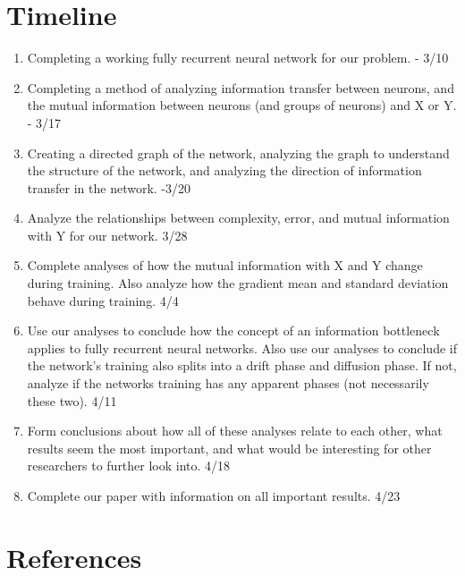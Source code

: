 \section{Timeline}
\begin{enumerate}
	\item Completing a working fully recurrent neural network for our problem. - 3/10
	\item Completing a method of analyzing information transfer between neurons, and the mutual information between neurons (and groups of neurons) and X or Y. - 3/17
	\item Creating a directed graph of the network, analyzing the graph to understand the structure of the network, and analyzing the direction of information transfer in the network. -3/20
	\item Analyze the relationships between complexity, error, and mutual information with Y for our network. 3/28
	\item Complete analyses of how the mutual information with X and Y change during training. Also analyze how the gradient mean and standard deviation behave during training. 4/4
	\item Use our analyses to conclude how the concept of an information bottleneck applies to fully recurrent neural networks. Also use our analyses to conclude if the network’s training also splits into a drift phase and diffusion phase. If not, analyze if the networks training has any apparent phases (not necessarily these two). 4/11
	\item Form conclusions about how all of these analyses relate to each other, what results seem the most important, and what would be interesting for other researchers to further look into. 4/18
	\item Complete our paper with information on all important results. 4/23
\end{enumerate}

\section{References}



